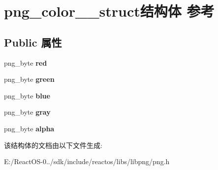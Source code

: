 \hypertarget{structpng__color__8__struct}{}\section{png\+\_\+color\+\_\+\_\+struct结构体 参考}
\label{structpng__color__8__struct}
\subsection*{Public 属性}
\begin{DoxyCompactItemize}
\item 
\mbox{\label{structpng__color__8__struct_a5cd91bb4b3429256b84e6f28c72778b8}} 
png\+\_\+byte {\bfseries red}
\item 
\mbox{\label{structpng__color__8__struct_a40d053224177df35c037525b39563b05}} 
png\+\_\+byte {\bfseries green}
\item 
\mbox{\label{structpng__color__8__struct_a58225d3b6426185d5a40d3c9935db96a}} 
png\+\_\+byte {\bfseries blue}
\item 
\mbox{\label{structpng__color__8__struct_a574edc173d956cca144927262e88653e}} 
png\+\_\+byte {\bfseries gray}
\item 
\mbox{\label{structpng__color__8__struct_af1c7203aefe12bd35dc9a4cdd58e7a4b}} 
png\+\_\+byte {\bfseries alpha}
\end{DoxyCompactItemize}


该结构体的文档由以下文件生成\+:\begin{DoxyCompactItemize}
\item 
E\+:/\+React\+O\+S-\/0../sdk/include/reactos/libs/libpng/png.\+h\end{DoxyCompactItemize}
